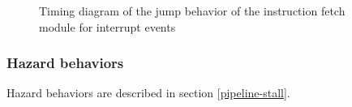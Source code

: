       \begin{figure}[H]
          \centering
          
          \caption{Timing diagram of the jump behavior of the instruction fetch module for interrupt events}
          \label{fig:ifm-behavior-interrupt}
        \end{figure}

    \subsubsection{Hazard behaviors}

      \begin{content}
          Hazard behaviors are described in section \ref{pipeline-stall}.
        \end{content}

\newpage

